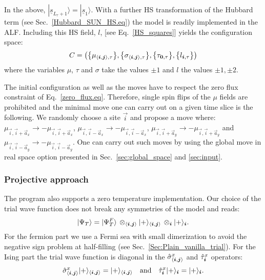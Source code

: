 In the above, $  | \underline{s}_{L_\tau+1}  \rangle  = | \underline{s}_{1}  \rangle   $.  With a further  HS transformation of the Hubbard term (see Sec.~\ref{Hubbard_SUN_HS.eq})  the model is readily implemented in the ALF.    Including this HS field, $l$,  [see Eq.~\eqref{HS_squares}] yields  the configuration space: 
\begin{equation}
	C = \left(  \big\{  \mu_{ \langle  \boldsymbol{i}, \boldsymbol{j} \rangle,\tau }  \big\},  \big\{  \sigma_{ \langle  \boldsymbol{i}, \boldsymbol{j} \rangle, \tau }  \big\},    \big\{ \tau_{\boldsymbol{0},\tau}  \big\},  \big\{ l_{\boldsymbol{i}, \tau}  \big\}  \right) 
\end{equation} 
where the variables $\mu$, $\tau$ and $\sigma$ take the values $\pm 1$  and $l$  the values $\pm1, \pm 2$. 

The initial configuration as well as the  moves have to respect the zero flux constraint of Eq.~\eqref{zero_flux.eq}. Therefore, single spin flips of the $\mu$ fields  are prohibited and the minimal move one can carry out on  a given time slice is the following. We randomly choose a site $\vec{i} $ and  propose a move where:
$ \mu_{\vec{i},\vec{i} +  \vec{a}_x} \rightarrow - \mu_{\vec{i},\vec{i} +  \vec{a}_x} $,  $ \mu_{\vec{i},\vec{i} -  \vec{a}_x} \rightarrow - \mu_{\vec{i},\vec{i} -  \vec{a}_x} $,
$ \mu_{\vec{i},\vec{i} +  \vec{a}_y} \rightarrow - \mu_{\vec{i},\vec{i} +  \vec{a}_y} $ and $ \mu_{\vec{i},\vec{i} -  \vec{a}_y} \rightarrow - \mu_{\vec{i},\vec{i} -  \vec{a}_y} $.  One can carry out such moves by using the global move in real space option presented in Sec.~\ref{sec:global_space} and \ref{sec:input}.

\subsubsection{Projective approach} 
The program also supports a zero temperature implementation.
Our  choice  of the trial wave  function does not break any symmetries of the model and reads: 
\begin{equation}
	| \Psi_T \rangle  =    | \Psi^{F}_T \rangle \,  \otimes_{\langle \boldsymbol{i},\boldsymbol{j} \rangle}  | + \rangle_{\langle \boldsymbol{i},\boldsymbol{j} \rangle }     \,  \otimes_{ \boldsymbol{i} }  | + \rangle_{ \boldsymbol{i} }.   
\end{equation}
For the fermion part we use a Fermi sea with small dimerization to avoid the negative sign problem at half-filling (see Sec.~\ref{Sec:Plain_vanilla_trial}).  For the Ising part the trial   wave function  is diagonal in the $ \hat{\sigma}^{x}_{\langle \boldsymbol{i}, \boldsymbol{j} \rangle} $ and $\hat{\tau}^{x}_{\boldsymbol{i}} $   operators: 
\begin{equation}
	\hat{\sigma}^{x}_{\langle \boldsymbol{i}, \boldsymbol{j} \rangle}  | + \rangle_{\langle \boldsymbol{i},\boldsymbol{j} \rangle}  = | + \rangle_{\langle \boldsymbol{i},\boldsymbol{j} \rangle }  \quad\text{and}\quad  \hat{\tau}^{x}_{\boldsymbol{i}} | + \rangle_{ \boldsymbol{i} } = | + \rangle_{ \boldsymbol{i} }.
\end{equation}

